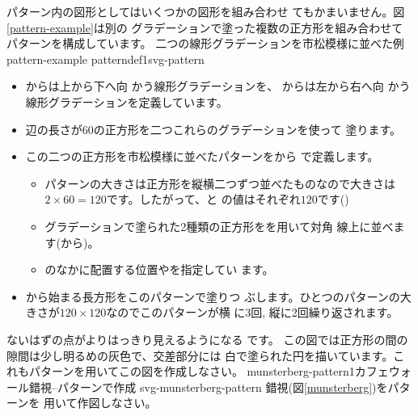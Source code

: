 パターン内の図形としてはいくつかの図形を組み合わせ
てもかまいません。図\ref{pattern-example}は別の
グラデーションで塗った複数の正方形を組み合わせてパターンを構成しています。
%
   {二つの線形グラデーションを市松模様に並べた例}
{pattern-example}
   {patterndef1}{svg-pattern}
\begin{itemize}
 \item  {}からは上から下へ向
	かう線形グラデーションを、 からは左から右へ向
	かう線形グラデーションを定義しています。
 \item 辺の長さが$60$の正方形を二つこれらのグラデーションを使って
       塗ります。
 \item この二つの正方形を市松模様に並べたパターンをから
       で定義します。
\begin{itemize}
 \item パターンの大きさは正方形を縦横二つずつ並べたものなので大きさは
       $2\times60=120$です。したがって、と
       の値はそれぞれ$120$です()
 \item グラデーションで塗られた2種類の正方形をを用いて対角
       線上に並べます(から)。
 \item {}のなかに配置する位置やを指定してい
       ます。
\end{itemize}
 \item {}から始まる長方形をこのパターンで塗りつ
       ぶします。ひとつのパターンの大きさが$120\times120$なのでこのパターンが横
       に3回, 縦に2回繰り返されます。
\end{itemize}
\iffalse
\begin{Problem}\upshape
 傾いたグラデーションを市松模様に並べた図形を作成しなさい。なお、
各パターンは長方形の辺に平行でかまいません。
\end{Problem}
\fi

{}
{ないはずの点がよりはっきり見えるようになる
です。
この図では正方形の間の隙間は少し明るめの灰色で、交差部分には
白で塗られた円を描いています。これもパターンを用いてこの図を作成しなさい。}
%
%
\ProbwithSol%
{munsterberg-pattern1}{カフェウォール錯視--パターンで作成}
{svg-munsterberg-pattern}
{錯視(図\ref{munsterberg})をパターンを
用いて作図しなさい。}

